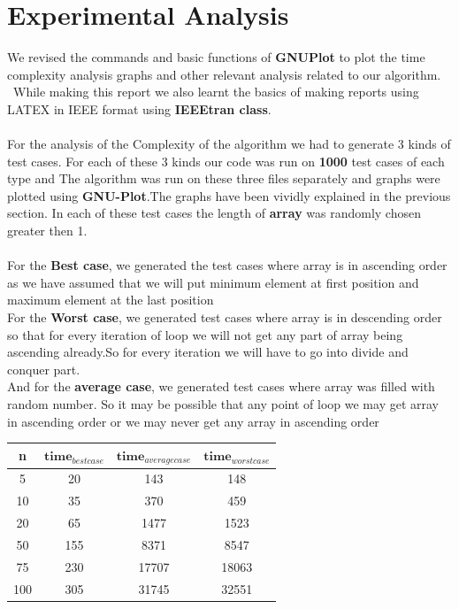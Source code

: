 \documentclass[conference]{IEEEtran}
\begin{document}
\section{\textbf{Experimental Analysis}}
We revised the commands and basic functions of \textbf{GNUPlot}
to plot the time complexity analysis graphs and other relevant
analysis related to our algorithm.
\\
\	While making this report we also learnt the basics of
making reports using LATEX in IEEE format using \textbf{IEEEtran class}.
\\\\
For the analysis of the Complexity of the algorithm we had to generate 3 kinds of test cases. For each of these 3 kinds our code was run on \textbf{1000} test cases of each type and The algorithm was run on these three files separately and graphs were plotted using \textbf{GNU-Plot}.The graphs have been vividly explained in the previous section. In each of these test cases the length of \textbf{array} was randomly chosen greater then 1.
\\
\\
For the \textbf{Best case}, we generated the test cases where array is in ascending order as we have assumed that we will put minimum element at first position and maximum element at the last position
\\

For the \textbf{Worst case}, we generated test cases where array is in descending order so that for every iteration of loop we will not get any part of array being ascending already.So for every iteration we will have to go into divide and conquer part.
\\

And for the \textbf{average case}, we generated test cases where array was filled with random number. So it may be possible that any point of loop we may get array in ascending order or we may never get any array in ascending order
 \\
\begin{table}[h!]
\begin{center}
    \label{tab:table1}
    \begin{tabular}{|c|c|c|c|} %
    \hline
      \textbf{n} & $\textbf{{time}}_{{best case}}$ & $\textbf{{time}}_{{average case}}$ & $\textbf{{time}}_{{worst case}}$
      \\
      \hline
      5 & 20 & 143 & 148\\
      \hline
      10 & 35 & 370 & 459\\
      \hline
      20 & 65 & 1477 & 1523\\
      \hline
      50 & 155 & 8371 & 8547\\
      \hline
	  75 & 230 & 17707 & 18063\\
      \hline
	  100 & 305 & 31745 & 32551\\
      \hline
    \end{tabular}
\end{center}
\end{table}
\\
\end{document}
